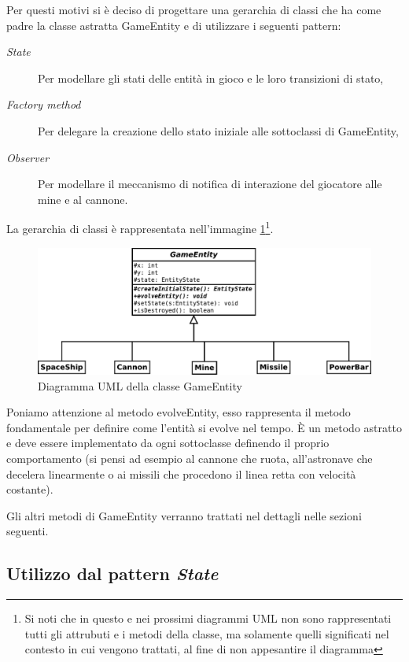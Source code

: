 \documentclass[a4paper,12pt]{article}
\begin{document}
Per questi motivi si \`e deciso di progettare una gerarchia di classi che ha come padre la classe astratta \textsf{GameEntity} e di utilizzare i seguenti pattern:
\begin{description}
\item[\emph{State}] Per modellare gli stati delle entit\`a in gioco e le loro transizioni di stato,
\item[\emph{Factory method}] Per delegare la creazione dello stato iniziale alle sottoclassi di \textsf{GameEntity},
\item[\emph{Observer}] Per modellare il meccanismo di notifica di interazione del giocatore alle mine e al cannone.
\end{description}

La gerarchia di classi \`e rappresentata nell'immagine \ref{img:GameEntity}\footnote{Si noti che in questo e nei prossimi diagrammi UML non sono rappresentati tutti gli attrubuti e i metodi della classe, ma solamente quelli significati nel contesto in cui vengono trattati, al fine di non appesantire il diagramma}.

\begin{figure}[h]
\centering
\includegraphics[width=15cm]{GameEntity.pdf}
\caption{Diagramma UML della classe \textsf{GameEntity}}
\label{img:GameEntity}
\end{figure}

Poniamo attenzione al metodo \textsf{evolveEntity}, esso rappresenta il metodo fondamentale per definire come l'entit\`a si evolve nel tempo. \`E un metodo astratto e deve essere implementato da ogni sottoclasse definendo il proprio comportamento (si pensi ad esempio al cannone che ruota, all'astronave che decelera linearmente o ai missili che procedono il linea retta con velocit\`a costante).

Gli altri metodi di \textsf{GameEntity} verranno trattati nel dettagli nelle sezioni seguenti.

\subsection{Utilizzo dal pattern \emph{State}}
\label{sec:state}
\end{document}
